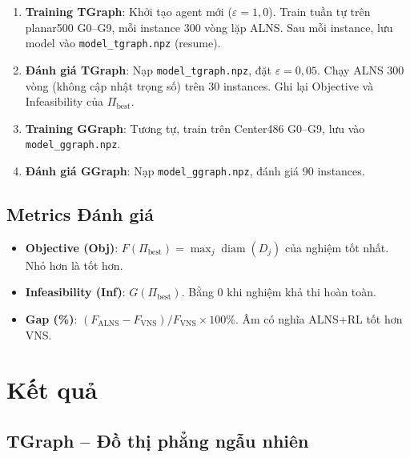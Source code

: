 \documentclass[12pt, a4paper]{article}
\begin{document}
\begin{enumerate}
  \item \textbf{Training TGraph}: Khởi tạo agent mới ($\varepsilon = 1{,}0$).
        Train tuần tự trên planar500 G0--G9, mỗi instance 300 vòng lặp ALNS.
        Sau mỗi instance, lưu model vào \texttt{model\_tgraph.npz} (resume).

  \item \textbf{Đánh giá TGraph}: Nạp \texttt{model\_tgraph.npz},
        đặt $\varepsilon = 0{,}05$. Chạy ALNS 300 vòng (không cập nhật trọng số)
        trên 30 instances. Ghi lại Objective và Infeasibility của $\Pi_{\text{best}}$.

  \item \textbf{Training GGraph}: Tương tự, train trên Center486 G0--G9,
        lưu vào \texttt{model\_ggraph.npz}.

  \item \textbf{Đánh giá GGraph}: Nạp \texttt{model\_ggraph.npz},
        đánh giá 90 instances.
\end{enumerate}

\subsection{Metrics Đánh giá}

\begin{itemize}
  \item \textbf{Objective (Obj)}: $F(\Pi_{\text{best}}) = \max_j \operatorname{diam}(D_j)$
        của nghiệm tốt nhất. Nhỏ hơn là tốt hơn.
  \item \textbf{Infeasibility (Inf)}: $G(\Pi_{\text{best}})$.
        Bằng 0 khi nghiệm khả thi hoàn toàn.
  \item \textbf{Gap (\%)}: $(F_{\text{ALNS}} - F_{\text{VNS}}) / F_{\text{VNS}} \times 100\%$.
        Âm có nghĩa ALNS+RL tốt hơn VNS.
\end{itemize}

\section{Kết quả}
\label{sec:results}

\subsection{TGraph -- Đồ thị phẳng ngẫu nhiên}
\end{document}
